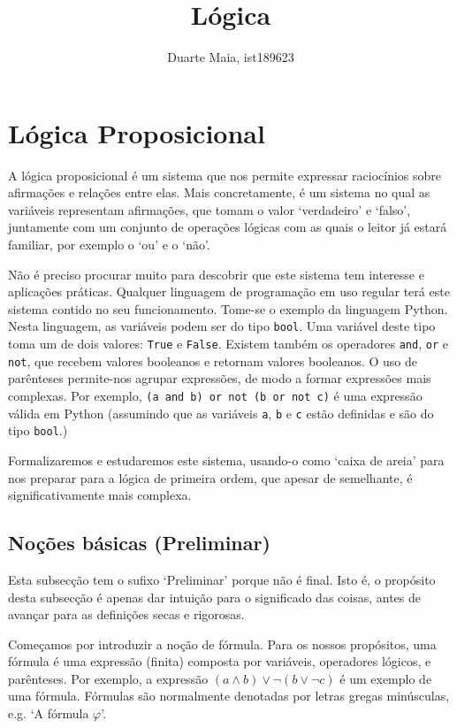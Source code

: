 \documentclass{report}
\title{Lógica}
\author{Duarte Maia, ist189623}
\date{}
\theoremstyle{definition}
\theoremstyle{remark}
\begin{document}
	\maketitle
	\newpage
	
	\tableofcontents
	\newpage
	
	\chapter{Lógica Proposicional}
	
	A lógica proposicional é um sistema que nos permite expressar raciocínios sobre afirmações e relações entre elas. Mais concretamente, é um sistema no qual as variáveis representam afirmações, que tomam o valor `verdadeiro' e `falso', juntamente com um conjunto de operações lógicas com as quais o leitor já estará familiar, por exemplo o `ou' e o `não'.
	
	Não é preciso procurar muito para descobrir que este sistema tem interesse e aplicações práticas. Qualquer linguagem de programação em uso regular terá este sistema contido no seu funcionamento. Tome-se o exemplo da linguagem Python. Nesta linguagem, as variáveis podem ser do tipo \texttt{bool}. Uma variável deste tipo toma um de dois valores: \texttt{True} e \texttt{False}. Existem também os operadores \texttt{and}, \texttt{or} e \texttt{not}, que recebem valores booleanos e retornam valores booleanos. O uso de parênteses permite-nos agrupar expressões, de modo a formar expressões mais complexas. Por exemplo, \texttt{(a and b) or not (b or not c)} é uma expressão válida em Python (assumindo que as variáveis \texttt{a}, \texttt{b} e \texttt{c} estão definidas e são do tipo \texttt{bool}.)
	
	Formalizaremos e estudaremos este sistema, usando-o como `caixa de areia' para nos preparar para a lógica de primeira ordem, que apesar de semelhante, é significativamente mais complexa.
	
	\section{Noções básicas (Preliminar)}
	
	Esta subsecção tem o sufixo `Preliminar' porque não é final. Isto é, o propósito desta subsecção é apenas dar intuição para o significado das coisas, antes de avançar para as definições secas e rigorosas.
	
	\bigskip
	
	Começamos por introduzir a noção de fórmula. Para os nossos propósitos, uma fórmula é uma expressão (finita) composta por variáveis, operadores lógicos, e parênteses. Por exemplo, a expressão $(a \land b) \lor \neg (b \lor \neg c)$ é um exemplo de uma fórmula. Fórmulas são normalmente denotadas por letras gregas minúsculas, e.g. `A fórmula $\varphi$'.
	
\end{document}
